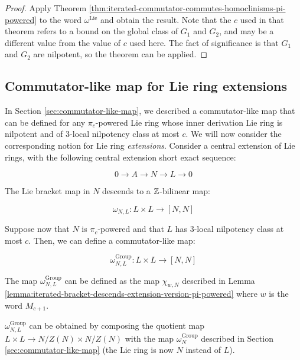 \begin{proof}
  Apply Theorem
  \ref{thm:iterated-commutator-commutes-homoclinisms-pi-powered} to
  the word $\omega^{\text{Lie}}$ and obtain the result. Note that the
  $c$ used in that theorem refers to a bound on the global class of
  $G_1$ and $G_2$, and may be a different value from the value of $c$
  used here. The fact of significance is that $G_1$ and $G_2$ are
  nilpotent, so the theorem can be applied.
\end{proof}


\subsection{Commutator-like map for Lie ring extensions}\label{sec:commutator-like-map-for-extensions}

In Section \ref{sec:commutator-like-map}, we described a
commutator-like map that can be defined for any $\pi_c$-powered Lie
ring whose inner derivation Lie ring is nilpotent and of $3$-local
nilpotency class at most $c$. We will now consider the corresponding
notion for Lie ring {\em extensions}. Consider a central extension of
Lie rings, with the following central extension short exact sequence:

$$0 \to A \to N \to L \to 0$$

The Lie bracket map in $N$ descends to a $\mathbb{Z}$-bilinear map:

$$\omega_{N,L}: L \times L \to [N,N]$$

Suppose now that $N$ is $\pi_c$-powered and that $L$ has $3$-local
nilpotency class at most $c$. Then, we can define a commutator-like
map:

$$\omega_{N,L}^{\text{Group}}: L \times L \to [N,N]$$

The map $\omega_{N,L}^{\text{Group}}$ can be defined as the map
$\chi_{w,N}$ described in Lemma
\ref{lemma:iterated-bracket-descends-extension-version-pi-powered}
where $w$ is the word $M_{c+1}$.

$\omega_{N,L}^{\text{Group}}$ can be obtained by composing the
quotient map $L \times L \to N/Z(N) \times N/Z(N)$ with the map
$\omega_N^{\text{Group}}$ described in Section
\ref{sec:commutator-like-map} (the Lie ring is now $N$ instead of
$L$).

